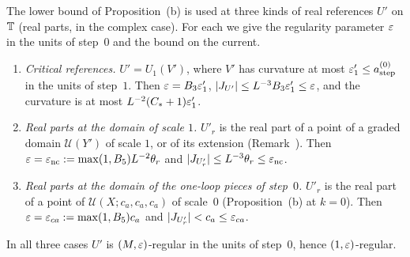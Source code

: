 \begin{detail}\label{xb:d-k0-refs}
The lower bound of Proposition~(b) is used at three kinds of real references $U'$ on $\mathbb T$ (real parts, in the complex case). For each we give the regularity parameter $\varepsilon$ in the units of step~$0$ and the bound on the current.
\begin{enumerate}[label=(\roman*)]
\item \emph{Critical references.} $U'=U_1(V')$, where $V'$ has curvature at most $\varepsilon'_1\le a^{(0)}_{\rm step}$ in the units of step~$1$. Then $\varepsilon=B_3\varepsilon'_1$, $|J_{U'}|\le L^{-3}B_3\varepsilon'_1\le\varepsilon$, and the curvature is at most $L^{-2}(C_*+1)\varepsilon'_1$.
\item \emph{Real parts at the domain of scale $1$.} $U'_r$ is the real part of a point of a graded domain $\mathcal U(Y')$ of scale $1$, or of its extension (Remark~). Then $\varepsilon=\varepsilon_{\rm nc}:=\max(1,B_5)L^{-2}\theta_r$ and $|J_{U'_r}|\le L^{-3}\theta_r\le\varepsilon_{\rm nc}$.
\item \emph{Real parts at the domain of the one-loop pieces of step~$0$.} $U'_r$ is the real part of a point of $\mathcal U(X;c_a,c_a,c_a)$ of scale~$0$ (Proposition~(b) at $k=0$). Then $\varepsilon=\varepsilon_{ca}:=\max(1,B_5)c_a$ and $|J_{U'_r}|<c_a\le\varepsilon_{ca}$.
\end{enumerate}
In all three cases $U'$ is $(M,\varepsilon)$-regular in the units of step~$0$, hence $(1,\varepsilon)$-regular.
\end{detail}

